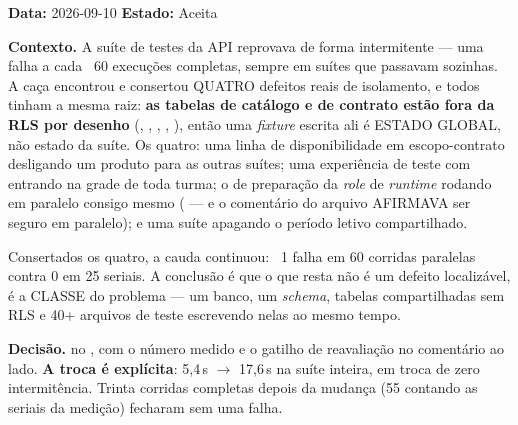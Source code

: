 \textbf{Data:} 2026-09-10 \quad \textbf{Estado:} Aceita

\textbf{Contexto.} A suíte de testes da API reprovava de forma intermitente ---
uma falha a cada ~60 execuções completas, sempre em suítes que passavam
sozinhas. A caça encontrou e consertou QUATRO defeitos reais de isolamento, e
todos tinham a mesma raiz: \textbf{as tabelas de catálogo e de contrato estão
fora da RLS por desenho} (, ,
, , ), então
uma \emph{fixture} escrita ali é ESTADO GLOBAL, não estado da suíte. Os quatro:
uma linha de disponibilidade em escopo-contrato desligando um produto para as
outras suítes; uma experiência de teste com  entrando na
grade de toda turma; o  de preparação da \emph{role} de \emph{runtime}
rodando em paralelo consigo mesmo ( --- e o
comentário do arquivo AFIRMAVA ser seguro em paralelo); e uma suíte apagando o
período letivo compartilhado.

Consertados os quatro, a cauda continuou: ~1 falha em 60 corridas paralelas
contra 0 em 25 seriais. A conclusão é que o que resta não é um defeito
localizável, é a CLASSE do problema --- um banco, um \emph{schema}, tabelas
compartilhadas sem RLS e 40+ arquivos de teste escrevendo nelas ao mesmo tempo.

\textbf{Decisão.}  no , com o
número medido e o gatilho de reavaliação no comentário ao lado. \textbf{A troca
é explícita}: 5,4\,s $\to$ 17,6\,s na suíte inteira, em troca de zero
intermitência. Trinta corridas completas depois da mudança (55 contando as
seriais da medição) fecharam sem uma falha.

